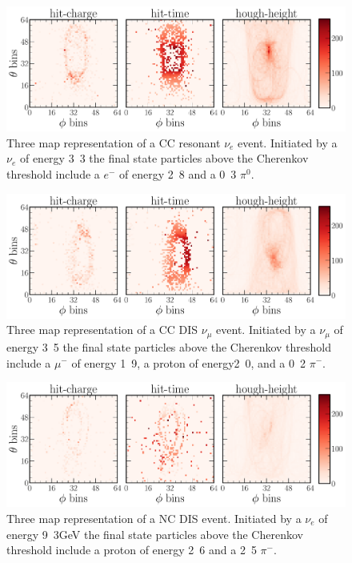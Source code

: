 \begin{figure} %
    \includegraphics[width=\textwidth]{diagrams/7-results/explore_nuel_ccres_event.pdf}
    \caption[Example of a CC resonant $\nu_{e}$ event]
    {Three map representation of a CC resonant $\nu_{e}$ event. Initiated by a $\nu_{e}$ of energy
        \unit{3.3}{\GeV} the final state particles above the Cherenkov threshold include a $e^{-}$
        of energy \unit{2.8}{\GeV} and a \unit{0.3}{\GeV} $\pi^{0}$.}
    \label{fig:explore_nuel_ccres_event}
\end{figure}

\begin{figure} %
    \includegraphics[width=\textwidth]{diagrams/7-results/explore_numu_ccdis_event.pdf}
    \caption[Example of a CC DIS $\nu_{\mu}$ event]
    {Three map representation of a CC DIS $\nu_{\mu}$ event. Initiated by a $\nu_{\mu}$ of energy
        \unit{3.5}{\GeV} the final state particles above the Cherenkov threshold include a
        $\mu^{-}$ of energy \unit{1.9}{\GeV}, a proton of energy\unit{2.0}{\GeV}, and a
        \unit{0.2}{\GeV} $\pi^{-}$.}
    \label{fig:explore_numu_ccdis_event}
\end{figure}

\begin{figure} %
    \includegraphics[width=\textwidth]{diagrams/7-results/explore_nuel_ncdis_event.pdf}
    \caption[Example of a NC DIS event]
    {Three map representation of a NC DIS event. Initiated by a $\nu_{e}$ of energy
        \unit{9.3}{GeV} the final state particles above the Cherenkov threshold include a proton
        of energy \unit{2.6}{\GeV} and a \unit{2.5}{\GeV} $\pi^{-}$.}
    \label{fig:explore_nuel_ncdis_event}
\end{figure}

